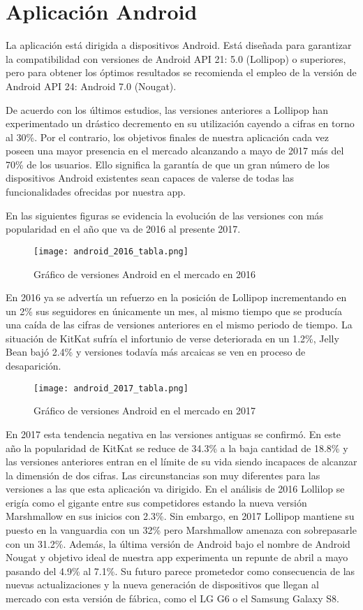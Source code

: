 \documentclass[11pt,spanish,
		listoftables,listoffigures]
		{tfgplantilla}
\begin{document}
\section {Aplicación Android}

La aplicación está dirigida a dispositivos Android. Está diseñada para garantizar la compatibilidad con versiones de Android API 21: 5.0 (Lollipop) o superiores, pero para obtener los óptimos resultados se recomienda el empleo de la versión de Android API 24: Android 7.0 (Nougat). 

De acuerdo con los últimos estudios, las versiones anteriores a Lollipop han experimentado un drástico decremento en su utilización cayendo a cifras en torno al 30\%. Por el contrario, los objetivos finales de nuestra aplicación cada vez poseen una mayor presencia en el mercado alcanzando a mayo de 2017 más del 70\% de los usuarios. Ello significa la garantía de que un gran número de los dispositivos Android existentes sean capaces de valerse de todas las funcionalidades ofrecidas por nuestra app.

En las siguientes figuras se evidencia la evolución de las versiones con más popularidad en el año que va de 2016 al presente 2017.

\begin{figure}[H]
\centering
\texttt{[image: android\_2016\_tabla.png]}
\caption{Gráfico de versiones Android en el mercado en 2016}
\end{figure}

En 2016 ya se advertía un refuerzo en la posición de Lollipop incrementando en un 2\%  sus seguidores en únicamente un mes, al mismo tiempo que se producía una caída de las cifras de versiones anteriores en el mismo periodo de tiempo. La situación de KitKat sufría el infortunio de verse deteriorada en un 1.2\%, Jelly Bean bajó 2.4\% y versiones todavía más arcaicas se ven en proceso de desaparición.

\begin{figure}[H]
\centering
\texttt{[image: android\_2017\_tabla.png]}
\caption{Gráfico de versiones Android en el mercado en 2017}
\end{figure}

En 2017 esta tendencia negativa en las versiones antiguas se confirmó. En este año la popularidad de KitKat se reduce de 34.3\% a la baja cantidad de 18.8\% y las versiones anteriores entran en el límite de su vida siendo incapaces de alcanzar la dimensión de dos cifras. Las circunstancias son muy diferentes para las versiones a las que esta aplicación va dirigido. En el análisis de 2016 Lollilop se erigía como el gigante entre sus competidores estando la nueva versión Marshmallow en sus inicios con 2.3\%. Sin embargo, en 2017 Lollipop mantiene su puesto en la vanguardia con un 32\% pero Marshmallow amenaza con sobrepasarle con un 31.2\%. Además, la última versión de Android bajo el nombre de Android Nougat y objetivo ideal de nuestra app experimenta un repunte de abril a mayo pasando del 4.9\% al 7.1\%. Su futuro parece prometedor como consecuencia de las nuevas actualizaciones y la nueva generación de dispositivos que llegan al mercado con esta versión de fábrica, como el LG G6	 o el Samsung Galaxy S8.
\end{document}
